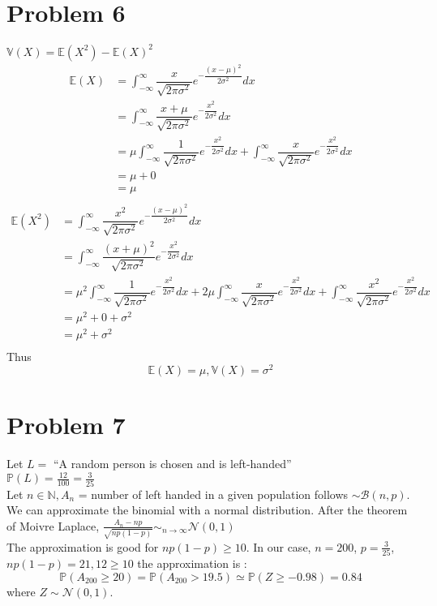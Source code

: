 \documentclass{article}
\begin{document}
\section*{Problem 6}
$\mathbb{V}(X) = \mathbb{E}(X^2)-\mathbb{E}(X)^2$\\
\begin{align*}
    \mathbb{E}(X) & = \displaystyle \int_{-\infty}^\infty \dfrac{x}{\sqrt{2\pi\sigma^2}}e^{-\dfrac{(x-\mu)^2}{2\sigma^2}}dx \\
     & = \displaystyle \int_{-\infty}^\infty \dfrac{x+\mu}{\sqrt{2\pi\sigma^2}}e^{-\dfrac{x^2}{2\sigma^2}}dx  \\
     & = \mu \displaystyle \int_{-\infty}^\infty \dfrac{1}{\sqrt{2\pi\sigma^2}}e^{-\dfrac{x^2}{2\sigma^2}}dx+\displaystyle \int_{-\infty}^\infty \dfrac{x}{\sqrt{2\pi\sigma^2}}e^{-\dfrac{x^2}{2\sigma^2}}dx \\
     & = \mu + 0 \\
     & = \mu \\
\end{align*}
\begin{align*}
    \mathbb{E}(X^2) & = \displaystyle \int_{-\infty}^\infty \dfrac{x^2}{\sqrt{2\pi\sigma^2}}e^{-\dfrac{(x-\mu)^2}{2\sigma^2}}dx \\
     & = \displaystyle \int_{-\infty}^\infty \dfrac{(x+\mu)^2}{\sqrt{2\pi\sigma^2}}e^{-\dfrac{x^2}{2\sigma^2}}dx  \\
     & = \mu^2 \displaystyle \int_{-\infty}^\infty \dfrac{1}{\sqrt{2\pi\sigma^2}}e^{-\dfrac{x^2}{2\sigma^2}}dx+2\mu\displaystyle \int_{-\infty}^\infty \dfrac{x}{\sqrt{2\pi\sigma^2}}e^{-\dfrac{x^2}{2\sigma^2}}dx +\displaystyle \int_{-\infty}^\infty \dfrac{x^2}{\sqrt{2\pi\sigma^2}}e^{-\dfrac{x^2}{2\sigma^2}}dx\\
     & = \mu^2 + 0 + \sigma^2 \\
     & = \mu^2 + \sigma^2 \\
\end{align*}
Thus $$\boxed{\mathbb{E}(X) = \mu, \mathbb{V}(X) = \sigma^2 }$$
\section*{Problem 7}
Let $L =$ ``A random person is chosen and is left-handed''\\
$\mathbb{P}(L) = \frac{12}{100} = \frac{3}{25}$\\
Let $n\in\mathbb{N},A_n$ = number of left handed in a given population follows $\sim \mathcal{B}(n,p)$.
We can approximate the binomial with a normal distribution. After the theorem of Moivre Laplace, $\frac{A_n -np}{\sqrt{np(1-p)}} \sim_{n\to\infty} \mathcal{N}(0,1)$ \\
The approximation is good for $np(1-p) \ge 10$. In our case, $n=200$, $p=\frac{3}{25}$, $np(1-p) = 21,12\ge 10$ the approximation is : $$\boxed{\mathbb{P}(A_{200} \ge 20) = \mathbb{P}(A_{200}>19.5) \simeq\mathbb{P}(Z \ge -0.98) = 0.84}$$ where $Z\sim\mathcal{N}(0,1)$.
\end{document}

